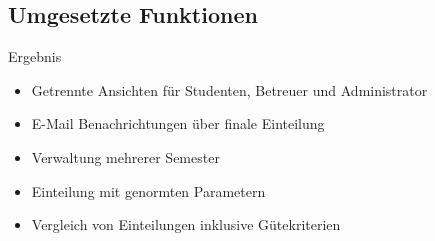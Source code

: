\documentclass[18pt]{beamer}
\begin{document}
\subsection{Umgesetzte Funktionen}
\begin{frame}{Ergebnis} 
\begin{itemize}
 \item Getrennte Ansichten für Studenten, Betreuer und Administrator
 \item E-Mail Benachrichtungen über finale Einteilung
 \item Verwaltung mehrerer Semester
 \item Einteilung mit genormten Parametern
 \item Vergleich von Einteilungen inklusive Gütekriterien
\end{itemize}
\end{frame}
\end{document}
